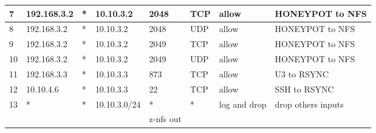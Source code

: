 \documentclass[a4paper, 11pt, oneside]{article}
\begin{document}
\begin{table}[H]
\begin{tabular}{|llllllll|}
  \multicolumn{1}{|l|}{7}          & \multicolumn{1}{l|}{192.168.3.2}     & \multicolumn{1}{l|}{*}           & \multicolumn{1}{l|}{10.10.3.2}            & \multicolumn{1}{l|}{2048}        & \multicolumn{1}{l|}{TCP}               & \multicolumn{1}{l|}{allow}           & HONEYPOT to NFS     \\ \hline
  \multicolumn{1}{|l|}{8}          & \multicolumn{1}{l|}{192.168.3.2}     & \multicolumn{1}{l|}{*}           & \multicolumn{1}{l|}{10.10.3.2}            & \multicolumn{1}{l|}{2048}        & \multicolumn{1}{l|}{UDP}               & \multicolumn{1}{l|}{allow}           & HONEYPOT to NFS     \\ \hline
  \multicolumn{1}{|l|}{9}          & \multicolumn{1}{l|}{192.168.3.2}     & \multicolumn{1}{l|}{*}           & \multicolumn{1}{l|}{10.10.3.2}            & \multicolumn{1}{l|}{2049}        & \multicolumn{1}{l|}{TCP}               & \multicolumn{1}{l|}{allow}           & HONEYPOT to NFS     \\ \hline
  \multicolumn{1}{|l|}{10}          & \multicolumn{1}{l|}{192.168.3.2}     & \multicolumn{1}{l|}{*}           & \multicolumn{1}{l|}{10.10.3.2}            & \multicolumn{1}{l|}{2049}        & \multicolumn{1}{l|}{UDP}               & \multicolumn{1}{l|}{allow}           & HONEYPOT to NFS     \\ \hline
  \multicolumn{1}{|l|}{11}          & \multicolumn{1}{l|}{192.168.3.3}     & \multicolumn{1}{l|}{*}           & \multicolumn{1}{l|}{10.10.3.3}            & \multicolumn{1}{l|}{873}         & \multicolumn{1}{l|}{TCP}               & \multicolumn{1}{l|}{allow}           & U3 to RSYNC         \\ \hline
  \multicolumn{1}{|l|}{12}           & \multicolumn{1}{l|}{10.10.4.6}       & \multicolumn{1}{l|}{*}           & \multicolumn{1}{l|}{10.10.3.3}            & \multicolumn{1}{l|}{22}          & \multicolumn{1}{l|}{TCP}               & \multicolumn{1}{l|}{allow}           & SSH to RSYNC        \\ \hline
  \multicolumn{1}{|l|}{13}           & \multicolumn{1}{l|}{*}               & \multicolumn{1}{l|}{*}           & \multicolumn{1}{l|}{10.10.3.0/24}         & \multicolumn{1}{l|}{*}           & \multicolumn{1}{l|}{*}                 & \multicolumn{1}{l|}{log and drop}            & drop others inputs  \\ \hline
                                    &                                      &                                  &                                           & {\color[HTML]{FE0000} z-nfs out} &                                        &                                      &                     \\ \hline

\end{tabular}
\end{table}
\end{document}
